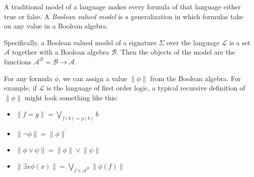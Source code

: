 \documentclass[12pt]{article}
\begin{document}
A traditional model of a language makes every formula of that language either true or false.  A \emph{Boolean valued model } is a generalization in which formulas take on any value in a Boolean algebra.

Specifically, a Boolean valued model of a signature $\Sigma$ over the language $\mathcal{L}$ is a set $\mathcal{A}$ together with a Boolean algebra $\mathcal{B}$.  Then the objects of the model are the functions $\mathcal{A}^\mathcal{B}=\mathcal{B}\rightarrow\mathcal{A}$.

For any formula $\phi$, we can assign a value $\lVert\phi\rVert$ from the Boolean algebra.  For example, if $\mathcal{L}$ is the language of first order logic, a typical recursive definition of $\lVert\phi\rVert$ might look something like this:
\begin{itemize}

\item $\lVert f=g \rVert=\bigvee_{f(b)=g(b)}b$

\item $\lVert\neg\phi\rVert=\lVert\phi\rVert^\prime$

\item $\lVert\phi\vee\psi\rVert=\lVert\phi\rVert\vee\lVert\psi\rVert$

\item $\lVert\exists x\phi(x)\rVert=\bigvee_{f\in\mathcal{A}^\mathcal{B}} \lVert\phi(f)\rVert$

\end{itemize}
\end{document}
